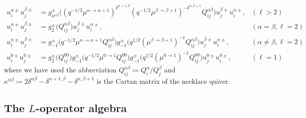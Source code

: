 \begin{align}
    u_i^{\alpha\pm} u_j^{\beta\pm} &= g_{\kappa^{\alpha\beta}}^\pm\big((q^{-1/2} \mu^{\alpha\to\alpha+1})^{\delta^{\alpha+1,\beta}} (q^{-1/2} \mu^{\beta\to\beta+1})^{-\delta^{\alpha,\beta+1}} Q_{ij}^{\alpha\beta}\big) u_j^{\beta\pm} u_i^{\alpha\pm}, & (\ell > 2) \\
    u_i^{\alpha\pm} u_j^{\beta\pm} &= g_{2}^\pm\big(Q_{ij}^{\alpha\beta}\big) u_j^{\beta\pm} u_i^{\alpha\pm}, & (\alpha = \beta,\ell = 2) \\
    u_i^{\alpha\pm} u_j^{\beta\pm} &= g_{-1}^\pm\big(q^{-1/2}\mu^{\alpha\to\alpha+1} Q_{ij}^{\alpha\beta}\big) g_{-1}^\pm\big(q^{1/2}(\mu^{\beta\to\beta+1})^{-1} Q_{ij}^{\alpha\beta}\big) u_j^{\beta\pm} u_i^{\alpha\pm}, & (\alpha \neq \beta,\ell = 2) \\
    u_i^{0\pm} u_j^{0\pm} &= g_{2}^\pm\big(Q_{ij}^{00}\big) g_{-1}^\pm\big(q^{-1/2}\mu^{0\to1} Q_{ij}^{00}\big) g_{-1}^\pm\big(q^{1/2}(\mu^{0\to1})^{-1} Q_{ij}^{00}\big) u_j^{0\pm} u_i^{0\pm}, & (\ell = 1)
\end{align}
where we have used the abbreviation $Q_{ij}^{\alpha\beta} \coloneq Q_i^\alpha/Q_j^\beta$ and $\kappa^{\alpha\beta} \coloneq 2\delta^{\alpha\beta} - \delta^{\alpha+1,\beta} - \delta^{\alpha,\beta+1}$ is the Cartan matrix of the necklace quiver.

\subsection{The $L$-operator algebra}\label{sec:LOpAlgebra}

